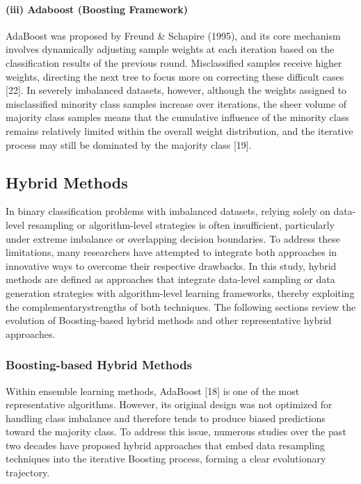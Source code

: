 \documentclass[sigconf]{acmart}
\begin{document}
\paragraph{(iii) Adaboost (Boosting Framework)}

AdaBoost was proposed by Freund \& Schapire (1995), and its core mechanism involves dynamically adjusting sample weights at each iteration based on the classification results of the previous round. Misclassified samples receive higher weights, directing the next tree to focus more on correcting these difficult cases [22]. In severely imbalanced datasets, however, although the weights assigned to misclassified minority class samples increase over iterations, the sheer volume of majority class samples means that the cumulative influence of the minority class remains relatively limited within the overall weight distribution, and the iterative process may still be dominated by the majority class [19]. 


\subsection{Hybrid Methods}

In binary classification problems with imbalanced datasets, relying solely on data-level resampling or algorithm-level strategies is often insufficient, particularly under extreme imbalance or overlapping decision boundaries. To address these limitations, many researchers have attempted to integrate both approaches in innovative ways to overcome their respective drawbacks. In this study, hybrid methods are defined as approaches that integrate data-level sampling or data generation strategies with algorithm-level learning frameworks, thereby exploiting the complementarystrengths of both techniques. The following sections review the evolution of Boosting-based hybrid methods and other representative hybrid approaches. 

\subsubsection{Boosting-based Hybrid Methods}

Within ensemble learning methods, AdaBoost [18] is one of the most representative algorithms. However, its original design was not optimized for handling class imbalance and therefore tends to produce biased predictions toward the majority class. To address this issue, numerous studies over the past two decades have proposed hybrid approaches that embed data resampling techniques into the iterative Boosting process, forming a clear evolutionary trajectory. 
\end{document}
